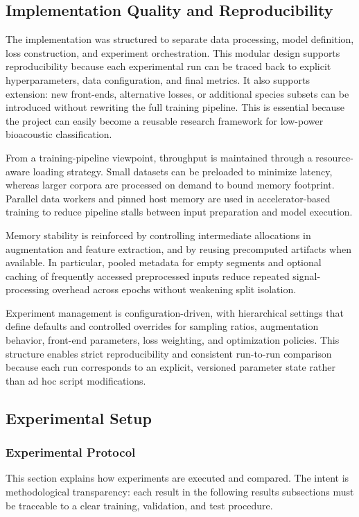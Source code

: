 \documentclass[a4paper,singleside,12pt]{report} %
\begin{document}
	\subsection{Implementation Quality and Reproducibility}
	The implementation was structured to separate data processing, model definition, loss construction, and experiment orchestration. This modular design supports reproducibility because each experimental run can be traced back to explicit hyperparameters, data configuration, and final metrics. It also supports extension: new front-ends, alternative losses, or additional species subsets can be introduced without rewriting the full training pipeline. This is essential because the project can easily become a reusable research framework for low-power bioacoustic classification.

		From a training-pipeline viewpoint, throughput is maintained through a resource-aware loading strategy. Small datasets can be preloaded to minimize latency, whereas larger corpora are processed on demand to bound memory footprint. Parallel data workers and pinned host memory are used in accelerator-based training to reduce pipeline stalls between input preparation and model execution.

		\begin{sloppypar}
		Memory stability is reinforced by controlling intermediate allocations in augmentation and feature extraction, and by reusing precomputed artifacts when available. In particular, pooled metadata for empty segments and optional caching of frequently accessed preprocessed inputs reduce repeated signal-processing overhead across epochs without weakening split isolation.
		\end{sloppypar}

	Experiment management is configuration-driven, with hierarchical settings that define defaults and controlled overrides for sampling ratios, augmentation behavior, front-end parameters, loss weighting, and optimization policies. This structure enables strict reproducibility and consistent run-to-run comparison because each run corresponds to an explicit, versioned parameter state rather than ad hoc script modifications.

	\subsection{Experimental Setup}
	\subsubsection{Experimental Protocol}
	This section explains how experiments are executed and compared. The intent is methodological transparency: each result in the following results subsections must be traceable to a clear training, validation, and test procedure.
\end{document}
